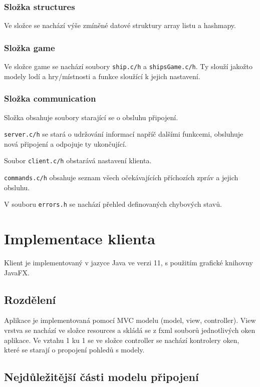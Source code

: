 \documentclass[12pt, a4paper]{article} %
\begin{document}
	\subsubsection{Složka structures}
	\par Ve složce se nachází výše zmíněné datové struktury array listu a hashmapy.
	\subsubsection{Složka game}
	\par Ve složce game se nachází soubory \texttt{ship.c/h} a \texttt{shipsGame.c/h}. Ty slouží jakožto modely lodí a hry/místnosti a funkce sloužící k jejich nastavení.
	\subsubsection{Složka communication}
	\par Složka obsahuje soubory starající se o obsluhu připojení.\\
	\par \texttt{server.c/h} se stará o udržování informací napříč dalšími funkcemi,  obsluhuje nová připojení a odpojuje ty ukončující.
	\par Soubor \texttt{client.c/h} obstarává nastavení klienta.
	\par \texttt{commands.c/h} obsahuje seznam všech očekávajících příchozích zpráv a jejich obsluhu.
	\par V souboru \texttt{errors.h} se nachází přehled definovaných chybových stavů.	
	
	\section{Implementace klienta}
	\par Klient je implementovaný v jazyce Java ve verzi 11, s použitím grafické knihovny JavaFX.
	\subsection{Rozdělení}
	\par Aplikace je implementovaná pomocí MVC modelu (model, view, controller). 
	View vrstva se nachází ve složce resources a skládá se z fxml souborů jednotlivých oken aplikace. Ve vztahu 1 ku 1  se ve složce controller se nachází kontrolery oken, které se starají o propojení pohledů s modely.\\
	
	\subsection{Nejdůležitější části modelu připojení}	
\end{document}
